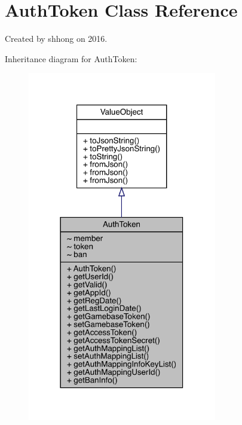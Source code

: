 \hypertarget{classcom_1_1toast_1_1android_1_1gamebase_1_1auth_1_1data_1_1_auth_token}{}\section{Auth\+Token Class Reference}
\label{classcom_1_1toast_1_1android_1_1gamebase_1_1auth_1_1data_1_1_auth_token}


Created by shhong on 2016.  




Inheritance diagram for Auth\+Token\+:\nopagebreak
\begin{figure}[H]
\begin{center}
\leavevmode
\includegraphics[width=234pt]{classcom_1_1toast_1_1android_1_1gamebase_1_1auth_1_1data_1_1_auth_token__inherit__graph}
\end{center}
\end{figure}


